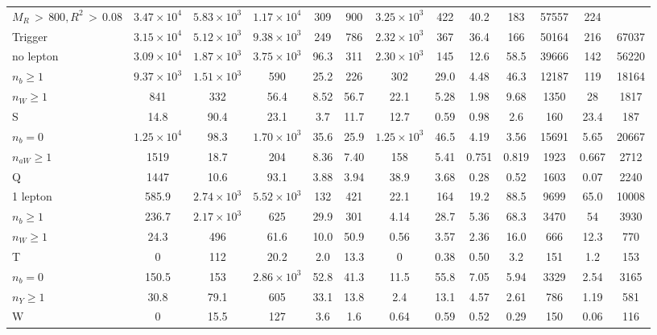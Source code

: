 \begin{sidewaystable}[p]
{\begin{tabular}{ l || c  c  c  c  c  c  c  c  c | c || c || c }
$M_R \,{>}\, 800, R^2 \,{>}\, 0.08$ & $3.47\times 10^4$ & $5.83\times 10^3$ & $1.17\times 10^4$ & 309 & 900 & $3.25\times 10^3$ & 422 & 40.2 & 183 & 57557 & 224 & \\
Trigger & $3.15\times 10^4$ & $5.12\times 10^3$ & $9.38\times 10^3$ & 249 & 786 & $2.32\times 10^3$ & 367 & 36.4 & 166 & 50164 & 216 & 67037 \\
\hline \hline 
no lepton & $3.09\times 10^4$ & $1.87\times 10^3$ & $3.75\times 10^3$ & 96.3 & 311 & $2.30\times 10^3$ & 145 & 12.6 & 58.5 & 39666 & 142 & 56220 \\
\hline 
$n_b \geq 1$ & $9.37\times 10^3$ & $1.51\times 10^3$ & 590 & 25.2 & 226 & 302 & 29.0 & 4.48 & 46.3 & 12187 & 119 & 18164 \\
$n_W \geq 1$ & 841 & 332 & 56.4 & 8.52 & 56.7 & 22.1 & 5.28 & 1.98 & 9.68 & 1350 & 28 & 1817  \\
S & 14.8 & 90.4 & 23.1 & 3.7 & 11.7 & 12.7 & 0.59 & 0.98 & 2.6 & 160 & 23.4 & 187 \\
\hline
$n_b = 0$ & $1.25\times 10^4$ & 98.3 & $1.70\times 10^3$ & 35.6 & 25.9 & $1.25\times 10^3$ & 46.5 & 4.19 & 3.56 & 15691 & 5.65 & 20667 \\
$n_{aW} \geq 1$ & 1519 & 18.7 & 204 & 8.36 & 7.40 & 158 & 5.41 & 0.751 & 0.819 & 1923 & 0.667 & 2712 \\
Q & 1447 & 10.6 & 93.1 & 3.88 & 3.94 & 38.9 & 3.68 & 0.28 & 0.52 & 1603 & 0.07 & 2240 \\
\hline
\hline
1 lepton & 585.9 & $2.74\times 10^3$ & $5.52\times 10^3$ & 132 & 421 & 22.1 & 164 & 19.2 & 88.5 & 9699 & 65.0 & 10008 \\
\hline
$n_b \geq 1$ & 236.7 & $2.17\times 10^3$ & 625 & 29.9 & 301 & 4.14 & 28.7 & 5.36 & 68.3 & 3470 & 54 & 3930 \\
$n_W \geq 1$ & 24.3 & 496 & 61.6 & 10.0 & 50.9 & 0.56 & 3.57 & 2.36 & 16.0 & 666 & 12.3 & 770 \\
T & 0 & 112 & 20.2 & 2.0 & 13.3 & 0 & 0.38 & 0.50 & 3.2 & 151 & 1.2 & 153 \\
\hline
$n_b = 0$ & 150.5 & 153 & $2.86\times 10^3$ & 52.8 & 41.3 & 11.5 & 55.8 & 7.05 & 5.94 & 3329 & 2.54 & 3165 \\
$n_Y \geq 1$ & 30.8 & 79.1 & 605 & 33.1 & 13.8 & 2.4 & 13.1 & 4.57 & 2.61 & 786 & 1.19 & 581 \\
W & 0 & 15.5 & 127 & 3.6 & 1.6 & 0.64 & 0.59 & 0.52 & 0.29 & 150 & 0.06 & 116 \\
\hline
\end{tabular}
}
\label{tab:cutflow}
\end{sidewaystable}

